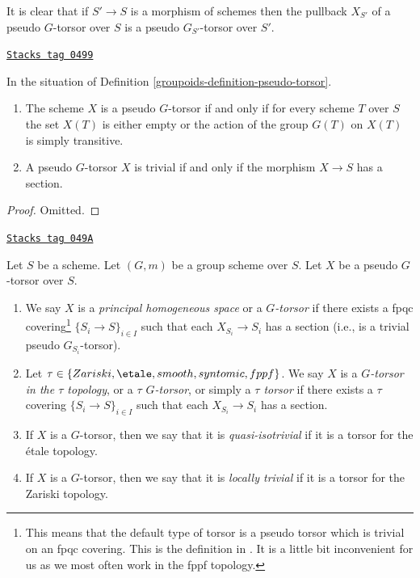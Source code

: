 It is clear that if $S' \to S$ is a morphism of schemes then
the pullback $X_{S'}$ of a pseudo $G$-torsor over $S$ is a
pseudo $G_{S'}$-torsor over $S'$.

\begin{lemma}
\label{groupoids-lemma-characterize-trivial-pseudo-torsors}
\href{https://stacks.math.columbia.edu/tag/0499}{\texttt{Stacks tag 0499}}

In the situation of
Definition \ref{groupoids-definition-pseudo-torsor}.
\begin{enumerate}
\item The scheme $X$ is a pseudo $G$-torsor if and only if for every scheme
$T$ over $S$ the set $X(T)$ is either empty or the action of the group $G(T)$
on $X(T)$ is simply transitive.
\item A pseudo $G$-torsor $X$ is trivial if and only if the morphism
$X \to S$ has a section.
\end{enumerate}
\end{lemma}

\begin{proof}
Omitted.
\end{proof}

\begin{definition}
\label{groupoids-definition-principal-homogeneous-space}
\href{https://stacks.math.columbia.edu/tag/049A}{\texttt{Stacks tag 049A}}

Let $S$ be a scheme.
Let $(G, m)$ be a group scheme over $S$.
Let $X$ be a pseudo $G$-torsor over $S$.
\begin{enumerate}
\item We say $X$ is a {\it principal homogeneous space}
or a {\it $G$-torsor} if there exists a fpqc covering\footnote{This means
that the default type of torsor is a pseudo torsor which is trivial on an
fpqc covering. This is the definition in \cite[Expos\'e IV, 6.5]{SGA3}.
It is a little bit inconvenient for us as we most often work in the fppf
topology.}
$\{S_i \to S\}_{i \in I}$ such that each
$X_{S_i} \to S_i$ has a section (i.e., is a trivial pseudo $G_{S_i}$-torsor).
\item Let $\tau \in \{Zariski, \etale, smooth, syntomic, fppf\}$.
We say $X$ is a {\it $G$-torsor in the $\tau$ topology}, or a
{\it $\tau$ $G$-torsor}, or simply a {\it $\tau$ torsor}
if there exists a $\tau$ covering $\{S_i \to S\}_{i \in I}$
such that each $X_{S_i} \to S_i$ has a section.
\item If $X$ is a $G$-torsor, then we say that it is
{\it quasi-isotrivial} if it is a torsor for the \'etale topology.
\item If $X$ is a $G$-torsor, then we say that it is
{\it locally trivial} if it is a torsor for the Zariski topology.
\end{enumerate}
\end{definition}

